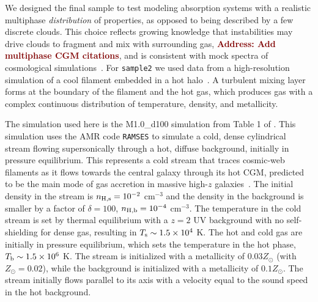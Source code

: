\documentclass[fleqn,usenatbib]{mnras}
\newcommand{\todo}[1]{\textcolor{Maroon}{\textbf{Address: #1}}}
\begin{document}
We designed the final sample to test modeling absorption systems with a realistic multiphase \textit{distribution} of properties, as opposed to being described by a few discrete clouds.
This choice reflects growing knowledge that instabilities may drive clouds to fragment and mix with surrounding gas, \todo{Add multiphase CGM citations}, and is consistent with mock spectra of cosmological simulations~\citep[e.g.][]{Marra2022}.
For \texttt{sample2} we used data from a high-resolution simulation of a cool filament embedded in a hot halo~\citep{Mandelker2020a}.
A turbulent mixing layer forms at the boundary of the filament and the hot gas, which produces gas with a complex continuous distribution of temperature, density, and metallicity.

The simulation used here is the M1.0\_d100 simulation from Table 1 of \cite{Mandelker2020a}.
This simulation uses the AMR code \texttt{RAMSES} \citep{Teyssier2002} to simulate a cold, dense cylindrical stream flowing supersonically through a hot, diffuse background, initially in pressure equilibrium.
This represents a cold stream that traces cosmic-web filaments as it flows towards the central galaxy through its hot CGM, predicted to be the main mode of gas accretion in massive high-$z$ galaxies~\citep{Keres2009a, Dekel2009}.
The initial density in the stream is $n_{\rm H,s}=10^{-2}$ cm$^{-3}$ and the density in the background is smaller by a factor of $\delta=100$, $n_{\rm H,b}=10^{-4}$ cm$^{-3}$.
The temperature in the cold stream is set by thermal equilibrium with a $z=2$ \cite{Haardt1996} UV background with no self-shielding for dense gas, resulting in $T_{\rm s}\sim 1.5 \times 10^4$ K.
The hot and cold gas are initially in pressure equilibrium, which sets the temperature in the hot phase, $T_{\rm b}\sim 1.5 \times 10^6$ K.
The stream is initialized with a metallicity of $0.03 Z_\odot$ (with $Z_\odot = 0.02$), while the background is initialized with a metallicity of $0.1 Z_\odot$.
The stream initially flows parallel to its axis with a velocity equal to the sound speed in the hot background.
\end{document}
